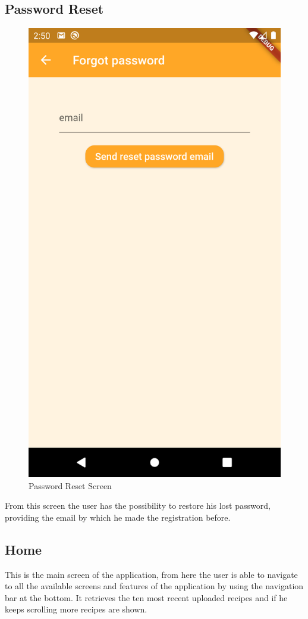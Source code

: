 \subsection{Password Reset}
\begin{figure}[H]
	\centering
	\includegraphics[width = .3\linewidth]{img/PasswordReset.png}
	\caption{Password Reset Screen}
\end{figure}
From this screen the user has the possibility to restore his lost password, providing the email by which he made the registration before.

\subsection{Home}
This is the main screen of the application, from here the user is able to navigate to all the available screens and features of the application by using the navigation bar at the bottom.
It retrieves the ten most recent uploaded recipes and if he keeps scrolling more recipes are shown.


